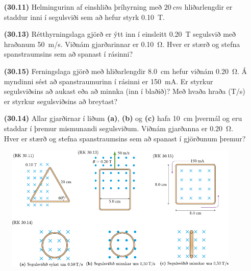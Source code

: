 \begin{enumerate}[label = \textbf{(\alph*)}]

\item[\textbf{(30.11)}] Helmingurinn af einshliða þríhyrning með $\SI{20}{cm}$ hliðarlengdir er staddur inni í segulsviði sem að hefur styrk \SI{0.10}{T}. 

\item[\textbf{(30.13)}] Rétthyrningslaga gjörð er ýtt inn í einsleitt \SI{0.20}{T} segulsvið með hraðanum \SI{50}{m/s}. Viðnám gjarðarinnar er \SI{0.10}{\ohm}. Hver er stærð og stefna spanstraumsins sem að spanast í rásinni?

\item[\textbf{(30.15)}] Ferningslaga gjörð með hliðarlengdir \SI{8.0}{cm} hefur viðnám \SI{0.20}{\ohm}. Á myndinni sést að spanstraumurinn í rásinni er \SI{150}{mA}. Er styrkur segulsviðsins að aukast eða að minnka (inn í blaðið)? Með hvaða hraða (\si{T/s}) er styrkur segulsviðsins að breytast?

\item[\textbf{(30.14)}] Allar gjarðirnar í liðum \textbf{(a)}, \textbf{(b)} og \textbf{(c)} hafa \SI{10}{cm} þvermál og eru staddar í þremur mismunandi segulsviðum. Viðnám gjarðanna er \SI{0.20}{\ohm}. Hver er stærð og stefna spanstraumsins sem að spanast í gjörðunum þremur?


\end{enumerate}

\begin{figure}[H]
    \centering
    \includegraphics[scale = 1.15]{figures/rk3011.pdf}
\end{figure}

